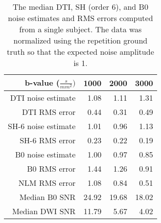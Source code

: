\begin{longtable}[c]{@{}rrrr@{}}
\caption{
The median DTI, SH (order 6), and B0 noise estimates and RMS errors computed from a single subject. The data was normalized using the repetition ground truth so that the expected noise amplitude is 1.}
\label{tab:humanEstimate}
\toprule
b-value (\(\frac{s}{mm^{2}})\) & 1000 & 2000 & 3000\tabularnewline
\midrule
\endhead
DTI noise estimate & 1.08 & 1.11 & 1.31\tabularnewline
DTI RMS error & 0.44 & 0.31 & 0.49\tabularnewline
SH-6 noise estimate & 1.01 & 0.96 & 1.13\tabularnewline
SH-6 RMS error & 0.23 & 0.22 & 0.19\tabularnewline
B0 noise estimate & 1.00 & 0.97 & 0.85\tabularnewline
B0 RMS error & 1.44 & 1.26 & 0.91\tabularnewline
NLM RMS error & 1.08 & 0.84 & 0.51\tabularnewline
Median B0 SNR & 24.92 & 19.68 & 18.02\tabularnewline
Median DWI SNR & 11.79 & 5.67 & 4.02\tabularnewline
\bottomrule
\end{longtable}